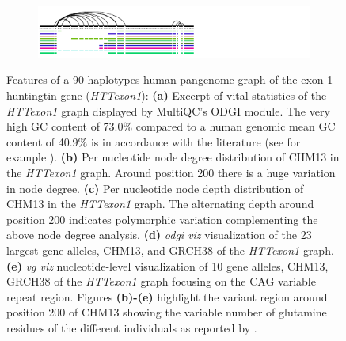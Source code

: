 \begin{figure}[ht!]
\begin{subfigure}{\linewidth}
    \end{subfigure}
    \begin{subfigure}{\linewidth}
        \caption{}
        \centering
        \includegraphics[width=1.0\linewidth, trim=-0.4cm 0.4cm 3.15cm 0cm]{fig/metrics/chr4_pan_HTTex1_STR_xg_svg}
        \label{fig:metrics-str}
    \end{subfigure}
	\caption{Features of a 90 haplotypes human pangenome graph of the exon 1 huntingtin gene (\textit{HTTexon1}): \textbf{(a)} Excerpt of vital statistics of the \textit{HTTexon1} graph displayed by MultiQC's ODGI module. The very high GC content of 73.0\% compared to a human genomic mean GC content of 40.9\% \cite{Piovesan2019} is in accordance with the literature (see for example \cite{Sathasivam2013, Neueder2017}). \textbf{(b)} Per nucleotide node degree distribution of CHM13 in the \textit{HTTexon1} graph. Around position 200 there is a huge variation in node degree. \textbf{(c)} Per nucleotide node depth distribution of CHM13 in the \textit{HTTexon1} graph. The alternating depth around position 200 indicates polymorphic variation complementing the above node degree analysis. \textbf{(d)} \textit{odgi viz} visualization of the 23 largest gene alleles, CHM13, and GRCH38 of the \textit{HTTexon1} graph. \textbf{(e)} \textit{vg viz} nucleotide-level visualization of 10 gene alleles, CHM13, GRCH38 of the \textit{HTTexon1} graph focusing on the CAG variable repeat region. Figures \textbf{(b)-(e)} highlight the variant region around position 200 of CHM13 showing the variable number of glutamine residues of the different individuals as reported by \cite{Nance1999}.}
	\label{fig:metrics}
\end{figure}
